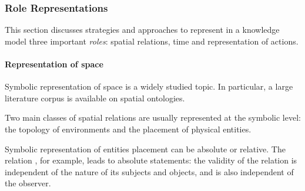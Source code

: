 \subsubsection{Role Representations}

This section discusses strategies and approaches to represent in a knowledge
model three important \emph{roles}: spatial relations, time and representation
of actions.

\begin{scriptsize}
\begin{center}
\end{center}
\end{scriptsize}


\paragraph{Representation of space}

Symbolic representation of space is a widely studied topic. In particular, a
large literature corpus is available on spatial ontologies.

Two main classes of spatial relations are usually represented at the symbolic
level: the topology of environments and the placement of physical entities.

\begin{scriptsize}
\begin{center}
\end{center}
\end{scriptsize}


Symbolic representation of entities placement can be absolute or relative. The
relation , for example, leads to absolute statements: the
validity of the relation is independent of the nature of its subjects and
objects, and is also independent of the observer.

